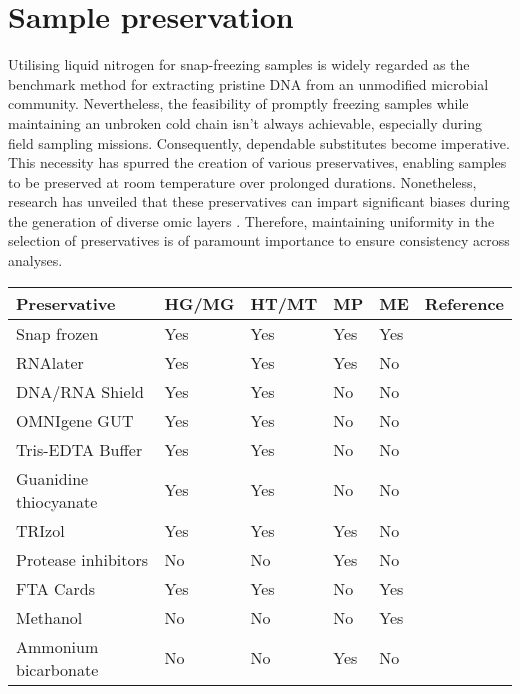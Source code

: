 \documentclass[
]{book}
\begin{document}
\hypertarget{fieldwork-sample-preservation}{%
\chapter{Sample preservation}\label{fieldwork-sample-preservation}}

Utilising liquid nitrogen for snap-freezing samples is widely regarded as the benchmark method for extracting pristine DNA from an unmodified microbial community. Nevertheless, the feasibility of promptly freezing samples while maintaining an unbroken cold chain isn't always achievable, especially during field sampling missions. Consequently, dependable substitutes become imperative. This necessity has spurred the creation of various preservatives, enabling samples to be preserved at room temperature over prolonged durations. Nonetheless, research has unveiled that these preservatives can impart significant biases during the generation of diverse omic layers \citep[\citet{Perez-Losada2016-nc}]{Bjerre2019-mb}. Therefore, maintaining uniformity in the selection of preservatives is of paramount importance to ensure consistency across analyses.

\begin{longtable}[]{@{}llllll@{}}
\toprule\noalign{}
Preservative & HG/MG & HT/MT & MP & ME & Reference \\
\midrule\noalign{}
\endhead
\bottomrule\noalign{}
\endlastfoot
Snap frozen & Yes & Yes & Yes & Yes & \citep{De_Spiegeleer2020-qc} \\
RNAlater & Yes & Yes & Yes & No & \citep{Van_Eijsden2013-dx} \\
DNA/RNA Shield & Yes & Yes & No & No & \citep{Schweighardt2015-xk} \\
OMNIgene GUT & Yes & Yes & No & No & \citep{Wang2018-fs} \\
Tris-EDTA Buffer & Yes & Yes & No & No & \citep{Barra2015-nv} \\
Guanidine thiocyanate & Yes & Yes & No & No & \citep{Weidner2022-da} \\
TRIzol & Yes & Yes & Yes & No & \citep{Simoes2013-xh} \\
Protease inhibitors & No & No & Yes & No & \citep{Ryan2017-pl} \\
FTA Cards & Yes & Yes & No & Yes & \citep{Bolt_Botnen2023-ql} \\
Methanol & No & No & No & Yes & \citep{Straughen2023-ia} \\
Ammonium bicarbonate & No & No & Yes & No & \citet{Hedges2013-ip} \\
\end{longtable}
\end{document}
